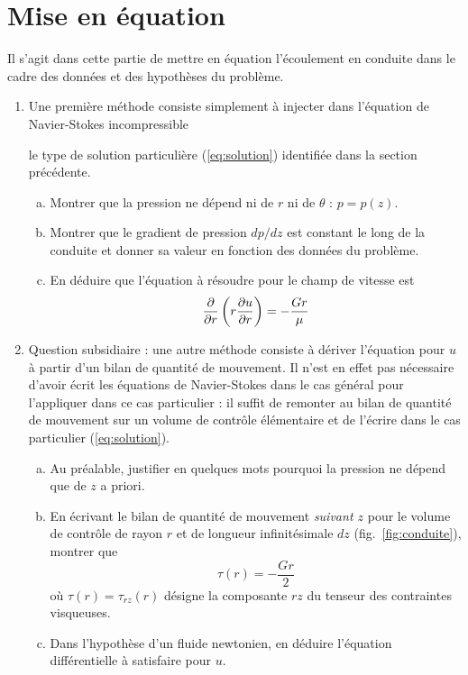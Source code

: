 \documentclass[10pt, a4paper]{article}
\newcommand{\footnoterecall}[1]{
\footnotemark[\value{#1}]
}
\begin{document}
\section{Mise en équation}

Il s'agit dans cette partie de mettre en équation l'écoulement en conduite
dans le cadre des données et des hypothèses du problème.

\begin{enumerate}
\item
Une première méthode consiste simplement à injecter dans l'équation de Navier-Stokes 
incompressible\footnoterecall{cylindriques}
le type de solution particulière (\ref{eq:solution}) identifiée dans la section précédente.
\begin{enumerate}[a)]
\item 
Montrer que la pression ne dépend ni de $r$ ni de $\theta$ : $p=p(z)$.
\item
Montrer que le gradient de pression $dp/dz$ est constant le long de la conduite et donner sa valeur en fonction des données du problème.
\item
En déduire que l'équation à résoudre pour le champ de vitesse est
\begin{equation}
	\displaystyle \frac{\partial }{\partial r} \left ( r \displaystyle \frac{\partial u}{\partial r}\right ) = -\frac{Gr}{\mu}
\label{eq:equation}
\end{equation}
\end{enumerate}
\item
Question subsidiaire : 
une autre méthode consiste à dériver l'équation pour $u$ à partir d'un bilan de quantité de mouvement.
Il n'est en effet pas nécessaire d'avoir écrit les équations de Navier-Stokes dans le cas général pour l'appliquer dans ce cas particulier : il suffit de remonter au bilan de quantité de mouvement sur un volume de contrôle
élémentaire et de l'écrire dans le cas particulier (\ref{eq:solution}).
\begin{enumerate}[a)]
\item 
	Au préalable, justifier en quelques mots pourquoi la pression ne dépend que de $z$ a priori.
\item
	En écrivant le bilan de quantité de mouvement \textsl{suivant $z$} pour le volume de contrôle
	de rayon $r$ et de longueur infinitésimale $dz$ (fig.~\ref{fig:conduite}),
	montrer que 
	\[
		\tau(r) = -\dfrac{Gr}{2}
	\]
	où $\tau(r) = \tau_{rz}(r)$ désigne la composante $rz$ du tenseur des contraintes visqueuses.
\item
	Dans l'hypothèse d'un fluide newtonien, en déduire l'équation différentielle
	à satisfaire pour $u$.
\end{enumerate}
\end{enumerate}
\end{document}
